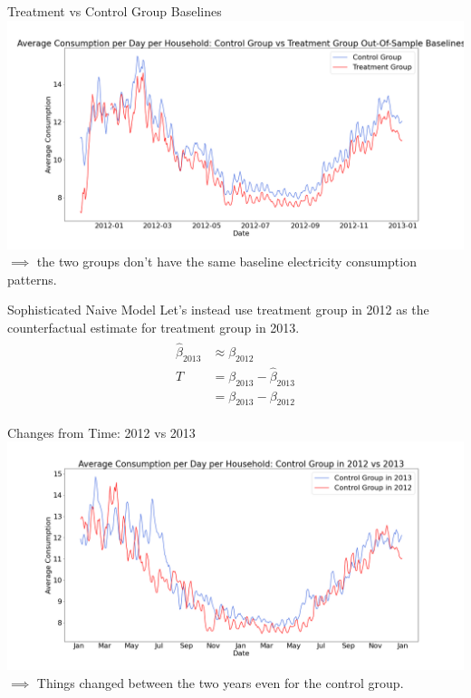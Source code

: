 \documentclass{beamer}
\begin{document}
\begin{frame}{Treatment vs Control Group Baselines}
  \centering
  \includegraphics[width=1\textwidth]{images/avg-consumption-per-day-baseline.png}
  $\implies$ the two groups don't have the same baseline electricity consumption patterns.
\end{frame}

\begin{frame}{Sophisticated Naive Model}
  Let's instead use treatment group in 2012 as the counterfactual estimate for treatment group in 2013.
  \begin{align}
    \begin{split}
      \hat\beta_{2013} & \approx \beta_{2012} \\
      T & = \beta_{2013} - \hat\beta_{2013} \\
        & = \beta_{2013} - \beta_{2012}
    \end{split}
  \end{align}
\end{frame}

\begin{frame}{Changes from Time: 2012 vs 2013}
  \centering
  \includegraphics[width=1\textwidth]{images/yoy-changes-control-group.png}
  $\implies$ Things changed between the two years even for the control group.
\end{frame}
\end{document}
